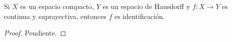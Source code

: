 

\begin{theorem}
Si $X$ es un espacio compacto, $Y$ es un espacio de Hausdorff y $f : X \longrightarrow Y$ es continua y suprayectiva, entonces $f$ es identificación.
\end{theorem}

\begin{proof}
Pendiente.
\end{proof}
